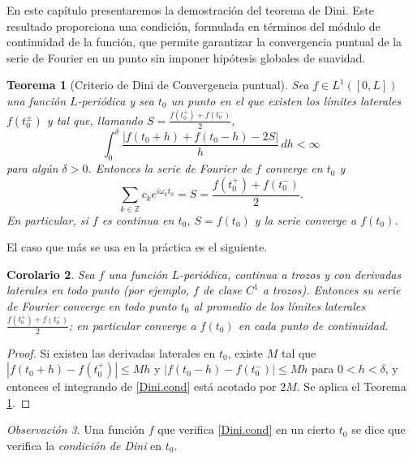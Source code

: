 \documentclass[12pt, a4paper]{amsbook}
\newcommand{\Z}{{\mathbb Z}}
\newtheorem{teo}{Teorema}[section]
\newtheorem{cor}[teo]{Corolario}
\theoremstyle{remark}
\newtheorem{obs}[teo]{Observación}
\theoremstyle{definition}
\numberwithin{section}{chapter}
\numberwithin{subsection}{section}
\numberwithin{equation}{section}
\numberwithin{figure}{chapter}
\begin{document}
En este capítulo presentaremos la demostración del teorema de Dini. Este resultado proporciona una condición, formulada en términos del módulo de continuidad de la función, que permite garantizar la convergencia puntual de la serie de Fourier en un punto sin imponer hipótesis globales de suavidad.

\begin{teo}[Criterio de Dini de Convergencia puntual]\label{teo.Dini}
Sea $f\in L^1([0,L])$ una función $L$-periódica y sea $t_0$ un punto en el que existen los límites laterales $f(t_0^\pm)$ y tal que, llamando $S = \frac{f(t_0^+)+f(t_0^-)}{2}$,
\begin{equation}\label{Dini.cond}
\int_0^\delta \frac{|f(t_0+h)+f(t_0-h)-2S|}{h}\,dh < \infty
\end{equation}
para algún $\delta>0$. Entonces la serie de Fourier de $f$ converge en $t_0$ y
$$
\sum_{k\in\Z} c_k e^{i\omega_k t_0} = S = \frac{f(t_0^+)+f(t_0^-)}{2}.
$$
En particular, si $f$ es continua en $t_0$, $S=f(t_0)$ y la serie converge a $f(t_0)$.
\end{teo}

El caso que más se usa en la práctica es el siguiente.

\begin{cor}\label{cor.Dini-trozos}
Sea $f$ una función $L$-periódica, continua a trozos y con derivadas laterales en todo punto (por ejemplo, $f$ de clase $C^1$ a trozos). Entonces su serie de Fourier converge en todo punto $t_0$ al promedio de los límites laterales $\frac{f(t_0^+)+f(t_0^-)}{2}$; en particular converge a $f(t_0)$ en cada punto de continuidad.
\end{cor}

\begin{proof}
Si existen las derivadas laterales en $t_0$, existe $M$ tal que $|f(t_0+h)-f(t_0^+)|\le Mh$ y $|f(t_0-h)-f(t_0^-)|\le Mh$ para $0<h<\delta$, y entonces el integrando de \eqref{Dini.cond} está acotado por $2M$. Se aplica el Teorema \ref{teo.Dini}.
\end{proof}

\begin{obs}
Una función $f$ que verifica \eqref{Dini.cond} en un cierto $t_0$ se dice que verifica la {\em condición de Dini} en $t_0$.
\end{obs}
\end{document}
